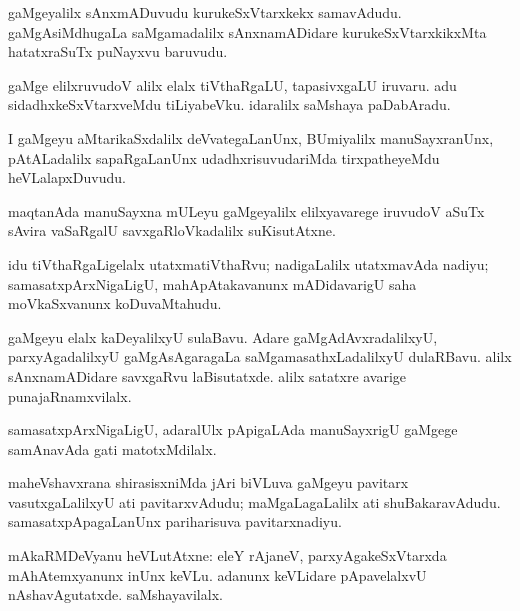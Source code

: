 \documentclass{article}
\begin{document}
\begin{mn}
gaMgeyalilx sAnxmADuvudu kurukeSxVtarxkekx samavAdudu. gaMgAsiMdhugaLa saMgamadalilx 
sAnxnamADidare kurukeSxVtarxkikxMta hatatxraSuTx puNayxvu baruvudu.
\end{mn}

\begin{mn}
gaMge elilxruvudoV alilx elalx tiVthaRgaLU, tapasivxgaLU iruvaru. adu sidadhxkeSxVtarxveMdu 
tiLiyabeVku. idaralilx saMshaya paDabAradu.
\end{mn}

\begin{mn}
I gaMgeyu aMtarikaSxdalilx deVvategaLanUnx, BUmiyalilx  manuSayxranUnx, pAtALadalilx sapaRgaLanUnx
udadhxrisuvudariMda tirxpatheyeMdu heVLalapxDuvudu.
\end{mn}

\begin{mn}
maqtanAda manuSayxna mULeyu gaMgeyalilx elilxyavarege iruvudoV aSuTx sAvira vaSaRgalU 
savxgaRloVkadalilx suKisutAtxne.
\end{mn}

\begin{mn}
idu tiVthaRgaLigelalx utatxmatiVthaRvu; nadigaLalilx utatxmavAda nadiyu; samasatxpArxNigaLigU, 
mahApAtakavanunx mADidavarigU saha moVkaSxvanunx koDuvaMtahudu.
\end{mn}

\begin{mn}
gaMgeyu elalx kaDeyalilxyU sulaBavu. Adare gaMgAdAvxradalilxyU, parxyAgadalilxyU gaMgAsAgaragaLa
saMgamasathxLadalilxyU dulaRBavu. alilx sAnxnamADidare savxgaRvu laBisutatxde. alilx satatxre 
avarige punajaRnamxvilalx.
\end{mn}

\begin{mn}
samasatxpArxNigaLigU, adaralUlx pApigaLAda manuSayxrigU gaMgege samAnavAda gati matotxMdilalx.
\end{mn}

\begin{mn}
maheVshavxrana shirasisxniMda jAri biVLuva gaMgeyu pavitarx vasutxgaLalilxyU ati pavitarxvAdudu; 
maMgaLagaLalilx ati shuBakaravAdudu. samasatxpApagaLanUnx pariharisuva pavitarxnadiyu.
\end{mn}


\begin{mn}
mAkaRMDeVyanu heVLutAtxne: eleY rAjaneV, parxyAgakeSxVtarxda mAhAtemxyanunx inUnx keVLu. 
adanunx keVLidare pApavelalxvU nAshavAgutatxde. saMshayavilalx.
\end{mn}
\end{document}
